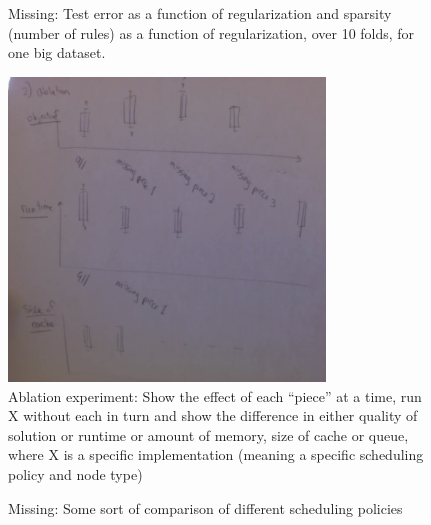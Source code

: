 \begin{arxiv}
\begin{figure}[t!]
\begin{center}
\end{center}
\caption{Missing:  Test error as a function of regularization and sparsity
(number of rules) as a function of regularization, over 10 folds,
for one big dataset.}
\label{fig:regularization}
\end{figure}
\end{arxiv}

\begin{arxiv}
\begin{figure}[t!]
\begin{center}
\includegraphics[width=0.75\textwidth]{figs/sketch-ablation.png}
\end{center}
\caption{Ablation experiment:
Show the effect of each ``piece'' at a time,
run X without each in turn and show the difference in either
quality of solution or runtime or amount of memory, size of cache or queue,
where X is a specific implementation
(meaning a specific scheduling policy and node type)}
\label{fig:ablation}
\end{figure}
\end{arxiv}

\begin{arxiv}
\begin{figure}[t!]
\begin{center}
\end{center}
\caption{Missing:  Some sort of comparison of different scheduling policies}
\label{fig:scheduling-policy}
\end{figure}
\end{arxiv}

